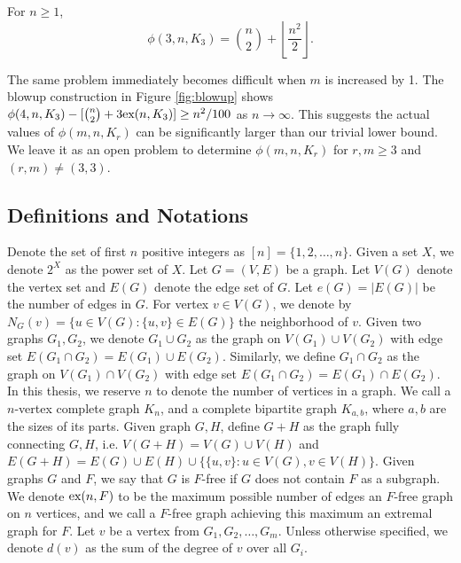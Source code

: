 \begin{theorem}\label{thm:triangles}
  For $n \geq 1$,
  \[
    \phi(3, n, K_3) = \binom{n}{2} + \left\lfloor \frac{n^2}{2} \right\rfloor.
  \]
\end{theorem}

The same problem immediately becomes difficult when $m$ is increased by 1. The blowup construction in Figure \ref{fig:blowup} shows $\phi(4, n, K_3) - [\binom{n}{2} + 3\textnormal{ex}(n, K_3)] \geq n^2/100$ as $n \to \infty$. This suggests the actual values of $\phi(m, n, K_r)$ can be significantly larger than our trivial lower bound. We leave it as an open problem to determine $\phi(m, n, K_r)$ for $r, m \geq 3$ and $(r, m) \neq (3, 3)$.

\subsection{Definitions and Notations}

Denote the set of first $n$ positive integers as $[n] = \{1, 2, \ldots, n\}$. Given a set $X$, we denote $2^X$ as the power set of $X$. Let $G = (V, E)$ be a graph. Let $V(G)$ denote the vertex set and $E(G)$ denote the edge set of $G$. Let $e(G) = |E(G)|$ be the number of edges in $G$. For vertex $v \in V(G)$, we denote by $N_G(v) = \{u \in V(G) : \{u, v\} \in E(G)\}$ the neighborhood of $v$. Given two graphs $G_1, G_2$, we denote $G_1 \cup G_2$ as the graph on $V(G_1) \cup V(G_2)$ with edge set $E(G_1 \cap G_2) = E(G_1) \cup E(G_2)$. Similarly, we define $G_1 \cap G_2$ as the graph on $V(G_1) \cap V(G_2)$ with edge set $E(G_1 \cap G_2) = E(G_1) \cap E(G_2)$. In this thesis, we reserve $n$ to denote the number of vertices in a graph. We call a $n$-vertex complete graph $K_n$, and a complete bipartite graph $K_{a, b}$, where $a, b$ are the sizes of its parts. Given graph $G, H$, define $G + H$ as the graph fully connecting $G, H$, i.e. $V(G + H) = V(G) \cup V(H)$ and $E(G + H) = E(G) \cup E(H) \cup \{\{u, v\} : u \in V(G), v \in V(H)\}$. Given graphs $G$ and $F$, we say that $G$ is $F$-free if $G$ does not contain $F$ as a subgraph. We denote $\textnormal{ex}(n, F)$ to be the maximum possible number of edges an $F$-free graph on $n$ vertices, and we call a $F$-free graph achieving this maximum an extremal graph for $F$. Let $v$ be a vertex from $G_1, G_2, \ldots, G_m$. Unless otherwise specified, we denote $d(v)$ as the sum of the degree of $v$ over all $G_i$.